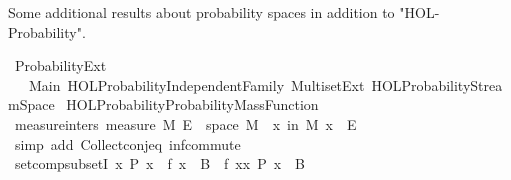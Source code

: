 %
\begin{isabellebody}%
%
%
\isadelimdocument
%
\endisadelimdocument
%
\isatagdocument
%
\isamarkuptrue%
%
\endisatagdocument
{\isafolddocument}%
%
\isadelimdocument
%
\endisadelimdocument
%
\begin{isamarkuptext}%
Some additional results about probability spaces in addition to "HOL-Probability".%
\end{isamarkuptext}\isamarkuptrue%
%
\isadelimtheory
%
\endisadelimtheory
%
\isatagtheory
{}\isamarkupfalse%
\ Probability{\isacharunderscore}{\kern0pt}Ext\isanewline
\ \ \ Main\ {\isachardoublequoteopen}HOL{\isacharminus}{\kern0pt}Probability{\isachardot}{\kern0pt}Independent{\isacharunderscore}{\kern0pt}Family{\isachardoublequoteclose}\ Multiset{\isacharunderscore}{\kern0pt}Ext\ {\isachardoublequoteopen}HOL{\isacharminus}{\kern0pt}Probability{\isachardot}{\kern0pt}Stream{\isacharunderscore}{\kern0pt}Space{\isachardoublequoteclose}\isanewline
\ {\isachardoublequoteopen}HOL{\isacharminus}{\kern0pt}Probability{\isachardot}{\kern0pt}Probability{\isacharunderscore}{\kern0pt}Mass{\isacharunderscore}{\kern0pt}Function{\isachardoublequoteclose}\isanewline
{}%
\endisatagtheory
{\isafoldtheory}%
%
\isadelimtheory
%
\endisadelimtheory
\isanewline
\isanewline
{}\isamarkupfalse%
\ measure{\isacharunderscore}{\kern0pt}inters{\isacharcolon}{\kern0pt}\ {\isachardoublequoteopen}measure\ M\ {\isacharparenleft}{\kern0pt}E\ {\isasyminter}\ space\ M{\isacharparenright}{\kern0pt}\ {\isacharequal}{\kern0pt}\ {\isasymP}{\isacharparenleft}{\kern0pt}x\ in\ M{\isachardot}{\kern0pt}\ x\ {\isasymin}\ E{\isacharparenright}{\kern0pt}{\isachardoublequoteclose}\isanewline
%
\isadelimproof
\ \ %
\endisadelimproof
%
\isatagproof
{}\isamarkupfalse%
\ {\isacharparenleft}{\kern0pt}simp\ add{\isacharcolon}{\kern0pt}\ Collect{\isacharunderscore}{\kern0pt}conj{\isacharunderscore}{\kern0pt}eq\ inf{\isacharunderscore}{\kern0pt}commute{\isacharparenright}{\kern0pt}%
\endisatagproof
{\isafoldproof}%
%
\isadelimproof
\isanewline
%
\endisadelimproof
\isanewline
{}\isamarkupfalse%
\ set{\isacharunderscore}{\kern0pt}comp{\isacharunderscore}{\kern0pt}subsetI{\isacharcolon}{\kern0pt}\ {\isachardoublequoteopen}{\isacharparenleft}{\kern0pt}{\isasymAnd}x{\isachardot}{\kern0pt}\ P\ x\ {\isasymLongrightarrow}\ f\ x\ {\isasymin}\ B{\isacharparenright}{\kern0pt}\ {\isasymLongrightarrow}\ {\isacharbraceleft}{\kern0pt}f\ x{\isacharbar}{\kern0pt}x{\isachardot}{\kern0pt}\ P\ x{\isacharbraceright}{\kern0pt}\ {\isasymsubseteq}\ B{\isachardoublequoteclose}\isanewline

\end{isabellebody}
